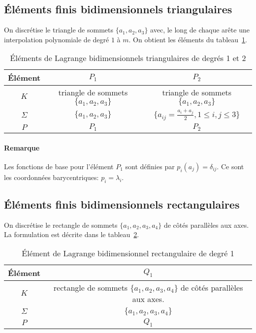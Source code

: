 \medskip
\subsection*{Éléments finis bidimensionnels triangulaires}
On discrétise le triangle de sommets $\{a_1, a_2, a_3\}$ avec, le long de chaque
arête une interpolation polynomiale de degré $1$ à $m$.
On obtient les éléments du tableau~\ref{tab:Elem:bi}.
\begin{table}[ht]\centering\small
\begin{tabular}{c|cc}
Élément & $P_1$ & $P_2$ \\
\hline
$K$	   & triangle de sommets $\{a_1, a_2, a_3\}$ & triangle de sommets $\{a_1, a_2, a_3\}$\\
$\Sigma$  & $\{a_1, a_2, a_3\}$ & $\{a_{ij}=\frac{a_i+a_j}2, 1\le i,j\le 3\}$ \\
$P$      & $P_1$ & $P_2$ \\
\hline
\end{tabular}
\caption{Éléments de Lagrange bidimensionnels triangulaires de degrés 1 et 2}\label{tab:Elem:bi}
\end{table}

\paragraph{Remarque}Les fonctions de base pour l'élément $P_1$ sont définies par $p_i(a_j) = \delta_{ij}$. Ce sont les coordonnées barycentriques: $p_i = \lambda_i$.

\medskip
\subsection*{Éléments finis bidimensionnels rectangulaires}
On discrétise le rectangle de sommets $\{a_1, a_2, a_3, a_4\}$ de côtés
parallèles aux axes. La formulation est décrite dans le tableau~\ref{tab:Elem:bibi}.
\begin{table}[ht]\centering\small
\begin{tabular}{c|c}
Élément & $Q_1$\\
\hline
$K$ & rectangle de sommets $\{a_1, a_2, a_3, a_4\}$ de côtés parallèles aux axes.\\
$\Sigma$ & $\{a_1, a_2, a_3, a_4\}$\\
$P$ & $Q_1$\\
\hline
\end{tabular}
\caption{Élément de Lagrange bidimensionnel rectangulaire de degré 1}\label{tab:Elem:bibi}
\end{table}

